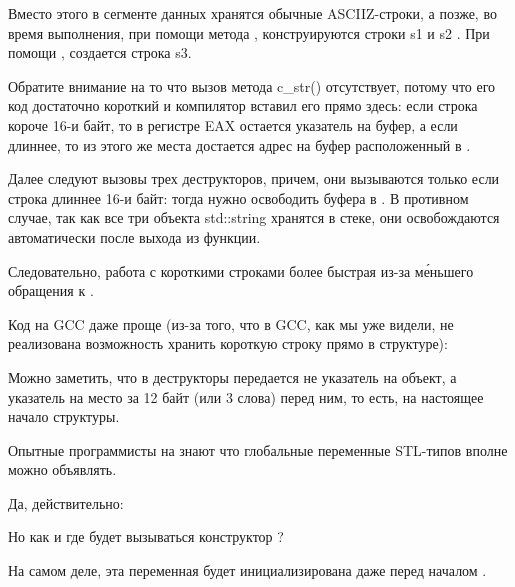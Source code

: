 Вместо этого в сегменте данных хранятся обычные \ac{ASCIIZ}-строки, а позже, во время выполнения, 
при помощи метода , конструируются строки s1 и s2
.
При помощи , создается строка s3.

Обратите внимание на то что вызов метода c\_str() отсутствует,
потому что его код достаточно короткий и компилятор вставил его прямо здесь:
если строка короче 16-и байт, то в регистре EAX остается указатель на буфер,
а если длиннее, то из этого же места достается адрес на буфер расположенный в .

Далее следуют вызовы трех деструкторов, причем, они вызываются только если строка длиннее 16-и байт:
тогда нужно освободить буфера в .
В противном случае, так как все три объекта std::string хранятся в стеке,
они освобождаются автоматически после выхода из функции.

Следовательно, работа с короткими строками более быстрая из-за м\'{е}ньшего обращения к .

Код на GCC даже проще (из-за того, что в GCC, как мы уже видели, не реализована возможность хранить короткую
строку прямо в структуре):



Можно заметить, что в деструкторы передается не указатель на объект,
а указатель на место за 12 байт (или 3 слова) перед ним, то есть, на настоящее начало структуры.

\label{sec:std_string_as_global_variable}

Опытные программисты на \Cpp знают что глобальные переменные \ac{STL}-типов вполне можно объявлять.

Да, действительно:



Но как и где будет вызываться конструктор ?

На самом деле, эта переменная будет инициализирована даже перед началом \main.





